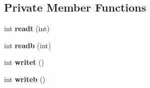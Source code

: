 \subsection*{Private Member Functions}
\begin{DoxyCompactItemize}
\item 
\hypertarget{classgcf__file_a116ea83de7a5bcade4bbb29c4beb7ffe}{int {\bfseries readt} (int)}\label{classgcf__file_a116ea83de7a5bcade4bbb29c4beb7ffe}

\item 
\hypertarget{classgcf__file_a0bb81ddb1c112ee0b6e82c69cc00e2e2}{int {\bfseries readb} (int)}\label{classgcf__file_a0bb81ddb1c112ee0b6e82c69cc00e2e2}

\item 
\hypertarget{classgcf__file_a24f370562956eb43af26da5f0194bffb}{int {\bfseries writet} ()}\label{classgcf__file_a24f370562956eb43af26da5f0194bffb}

\item 
\hypertarget{classgcf__file_a3d7b82926363bbae82d00bea32426d6a}{int {\bfseries writeb} ()}\label{classgcf__file_a3d7b82926363bbae82d00bea32426d6a}

\end{DoxyCompactItemize}
